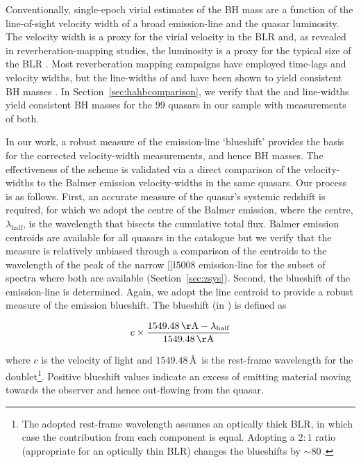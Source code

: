 Conventionally, single-epoch virial estimates of the BH mass are a function of the line-of-sight velocity width of a broad emission-line and the quasar luminosity. 
The velocity width is a proxy for the virial velocity in the BLR and, as revealed in reverberation-mapping studies, the luminosity is a proxy for the typical size of the BLR \citep[the $R_{\text{BLR}}-L$ relation; e.g.][]{kaspi00,kaspi07}. 
Most reverberation mapping campaigns have employed \hb time-lags and velocity widths, but the line-widths of \ha and  have been shown to yield consistent BH masses \citep[e.g.][]{mclure02,greene05b,onken08,shen08,wang09,rafiee11,mejia-restrepo16}. 
In Section~\ref{sec:hahbcomparison}, we verify that the \ha and \hb line-widths yield consistent BH masses for the $99$ quasars in our sample with measurements of both.     

In our work, a robust measure of the  emission-line `blueshift' provides the basis for the corrected  velocity-width measurements, and hence BH masses.
The effectiveness of the scheme is validated via a direct comparison of the  velocity-widths to the Balmer emission velocity-widths in the same quasars. 
Our process is as follows. 
First, an accurate measure of the quasar's systemic redshift is required, for which we adopt the centre of the Balmer emission, where the centre, $\lambda_{\text{half}}$, is the wavelength that bisects the cumulative total flux. 
Balmer emission centroids are available for all quasars in the catalogue but we verify that the measure is relatively unbiased through a comparison of the centroids to the wavelength of the peak of the narrow []\l$5008$ emission-line for the subset of spectra where both are available (Section~\ref{sec:zsys}). 
Second, the blueshift of the  emission-line is determined. 
Again, we adopt the line centroid to provide a robust measure of the  emission blueshift.
The blueshift (in \kms) is defined as

\begingroup\makeatletter{}\check@mathfonts
\begin{eqnarray}
\label{eq:civblueshift}
c \times \frac{1549.48\,{\mathrm \AA}-\lambda_{\text{half}}}{1549.48\,{\mathrm \AA}}
\end{eqnarray}
\endgroup

\noindent where $c$ is the velocity of light and $1549.48$\,\AA\, is the rest-frame wavelength for the  doublet\footnote{The adopted  rest-frame wavelength assumes an optically thick BLR, in which case the contribution from each component is equal. Adopting a $2:1$ ratio (appropriate for an optically thin BLR) changes the blueshifts by $\sim80$\,\kms.}. 
Positive blueshift values indicate an excess of emitting material moving towards the observer and hence out-flowing from the quasar. 


